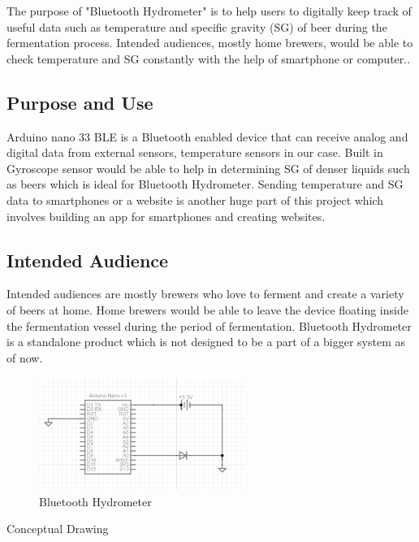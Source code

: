 The purpose of "Bluetooth Hydrometer" is to help users to digitally keep track of useful data such as temperature and specific gravity (SG) of beer during the fermentation process. Intended audiences, mostly home brewers, would be able to check temperature and SG constantly with the help of smartphone or computer..

\subsection{Purpose and Use}
Arduino nano 33 BLE is a Bluetooth enabled device that can receive analog and digital data from external sensors, temperature sensors in our case. Built in Gyroscope sensor would be able to help in determining SG of denser liquids such as beers which is ideal for Bluetooth Hydrometer. Sending temperature and SG data to smartphones or a website is another huge part of this project which involves building an app for smartphones and creating websites.
\subsection{Intended Audience}
Intended audiences are mostly brewers who love to ferment and create a variety of beers at home. Home brewers would be able to leave the device floating inside the fermentation vessel during the period of fermentation. Bluetooth Hydrometer is a standalone product which is not designed to be a part of a bigger system as of now. 

\begin{figure}[h!]
	\centering
   	\includegraphics[width=0.60\textwidth]{images/arduino_nano_v3_schematic}
    \caption{Bluetooth Hydrometer}
\end{figure}
Conceptual Drawing